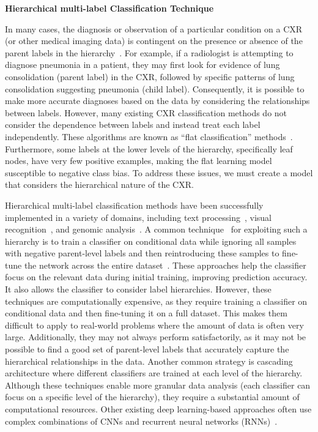 \textbf{Hierarchical multi-label Classification Technique}

In many cases, the diagnosis or observation of a particular condition on a CXR (or other medical imaging data) is contingent on the presence or absence of the parent labels in the hierarchy~\cite{vaneeden_Relationship_2012}. For example, if a radiologist is attempting to diagnose pneumonia in a patient, they may first look for evidence of lung consolidation (parent label) in the CXR, followed by specific patterns of lung consolidation suggesting pneumonia (child label). Consequently, it is possible to make more accurate diagnoses based on the data by considering the relationships between labels. However, many existing CXR classification methods do not consider the dependence between labels and instead treat each label independently. These algorithms are known as ``flat classification'' methods~\cite{alaydie_Exploiting_2012}. Furthermore, some labels at the lower levels of the hierarchy, specifically leaf nodes, have very few positive examples, making the flat learning model susceptible to negative class bias. To address these issues, we must create a model that considers the hierarchical nature of the CXR\@.

Hierarchical multi-label classification methods have been successfully implemented in a variety of domains, including text processing~\cite{aly_Hierarchical_2019}, visual recognition~\cite{bi_Mandatory_2014}, and genomic analysis~\cite{bi_BayesOptimal_2015}. A common technique~\cite{chen_Deep_2019} for exploiting such a hierarchy is to train a classifier on conditional data while ignoring all samples with negative parent-level labels and then reintroducing these samples to fine-tune the network across the entire dataset~\cite{chen_Deep_2019}. These approaches help the classifier focus on the relevant data during initial training, improving prediction accuracy. It also allows the classifier to consider label hierarchies. However, these techniques are computationally expensive, as they require training a classifier on conditional data and then fine-tuning it on a full dataset. This makes them difficult to apply to real-world problems where the amount of data is often very large. Additionally, they may not always perform satisfactorily, as it may not be possible to find a good set of parent-level labels that accurately capture the hierarchical relationships in the data. Another common strategy is cascading architecture where different classifiers are trained at each level of the hierarchy. Although these techniques enable more granular data analysis (each classifier can focus on a specific level of the hierarchy), they require a substantial amount of computational resources. Other existing deep learning-based approaches often use complex combinations of CNNs and recurrent neural networks (RNNs)~\cite{guo_CNNRNN_2018,kowsari_HDLTex_2017}.

